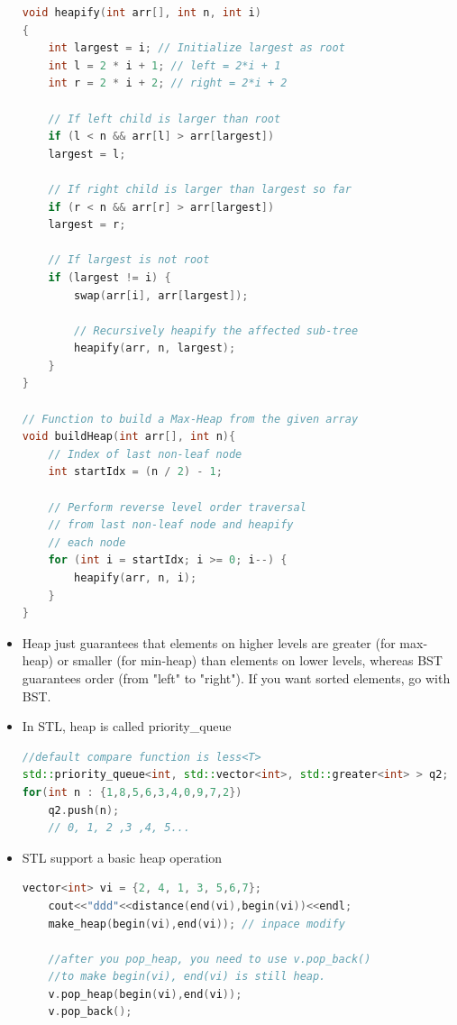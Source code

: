 \documentclass[a4paper,11pt,twoside]{book}
\begin{document}
\begin{itemize}
\begin{lstlisting}[frame=single, language=c++]
void heapify(int arr[], int n, int i)
{
	int largest = i; // Initialize largest as root
	int l = 2 * i + 1; // left = 2*i + 1
	int r = 2 * i + 2; // right = 2*i + 2
	
	// If left child is larger than root
	if (l < n && arr[l] > arr[largest])
	largest = l;
	
	// If right child is larger than largest so far
	if (r < n && arr[r] > arr[largest])
	largest = r;
	
	// If largest is not root
	if (largest != i) {
		swap(arr[i], arr[largest]);
		
		// Recursively heapify the affected sub-tree
		heapify(arr, n, largest);
	}
}

// Function to build a Max-Heap from the given array
void buildHeap(int arr[], int n){
	// Index of last non-leaf node
	int startIdx = (n / 2) - 1;
	
	// Perform reverse level order traversal
	// from last non-leaf node and heapify
	// each node
	for (int i = startIdx; i >= 0; i--) {
		heapify(arr, n, i);
	}
}
\end{lstlisting}

\item Heap just guarantees that elements on higher levels are greater (for max-heap) or smaller (for min-heap) than elements on lower levels, whereas BST guarantees order (from "left" to "right"). If you want sorted elements, go with BST.

\item In STL, heap is called priority\_queue

\begin{lstlisting}[frame=single, language=c++, mathescape=true, basicstyle=\scriptsize]
//default compare function is less<T>
std::priority_queue<int, std::vector<int>, std::greater<int> > q2;
for(int n : {1,8,5,6,3,4,0,9,7,2})
	q2.push(n);
    // 0, 1, 2 ,3 ,4, 5...
\end{lstlisting}


\item STL support a basic heap operation

\begin{lstlisting}[frame=single, language=c++, mathescape=true]
	vector<int> vi = {2, 4, 1, 3, 5,6,7};
	cout<<"ddd"<<distance(end(vi),begin(vi))<<endl;
	make_heap(begin(vi),end(vi)); // inpace modify
	
	//after you pop_heap, you need to use v.pop_back()
	//to make begin(vi), end(vi) is still heap. 
	v.pop_heap(begin(vi),end(vi));
	v.pop_back();
	

\end{lstlisting}
\end{itemize}
\end{document}
